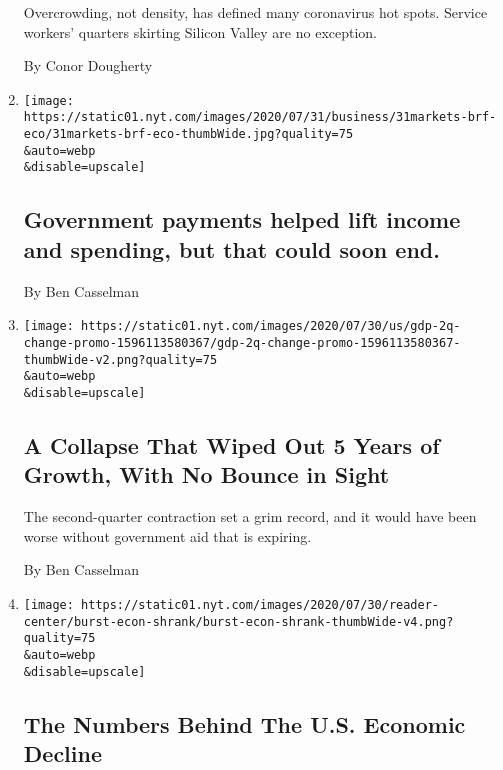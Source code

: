\begin{enumerate}
  Overcrowding, not density, has defined many coronavirus hot spots.
  Service workers' quarters skirting Silicon Valley are no exception.

  By Conor Dougherty
\item
  \href{/live/2020/07/31/business/stock-market-today-coronavirus/government-payments-helped-lift-income-and-spending-but-that-could-soon-end}{}

  \texttt{[image: https://static01.nyt.com/images/2020/07/31/business/31markets-brf-eco/31markets-brf-eco-thumbWide.jpg?quality=75\\\&auto=webp\\\&disable=upscale]}

  \hypertarget{government-payments-helped-lift-income-and-spending-but-that-could-soon-end}{%
  \subsection{Government payments helped lift income and spending, but
  that could soon
  end.}\label{government-payments-helped-lift-income-and-spending-but-that-could-soon-end}}

  By Ben Casselman
\item
  \href{/2020/07/30/business/economy/q2-gdp-coronavirus-economy.html}{}

  \texttt{[image: https://static01.nyt.com/images/2020/07/30/us/gdp-2q-change-promo-1596113580367/gdp-2q-change-promo-1596113580367-thumbWide-v2.png?quality=75\\\&auto=webp\\\&disable=upscale]}

  \hypertarget{a-collapse-that-wiped-out-5-years-of-growth-with-no-bounce-in-sight}{%
  \subsection{A Collapse That Wiped Out 5 Years of Growth, With No
  Bounce in
  Sight}\label{a-collapse-that-wiped-out-5-years-of-growth-with-no-bounce-in-sight}}

  The second-quarter contraction set a grim record, and it would have
  been worse without government aid that is expiring.

  By Ben Casselman
\item
  \href{/interactive/2020/07/30/business/economy-gdp-unemployment.html}{}

  \texttt{[image: https://static01.nyt.com/images/2020/07/30/reader-center/burst-econ-shrank/burst-econ-shrank-thumbWide-v4.png?quality=75\\\&auto=webp\\\&disable=upscale]}

  \hypertarget{the-numbers-behind-the-us-economic-decline}{%
  \subsection{The Numbers Behind The U.S. Economic
  Decline}\label{the-numbers-behind-the-us-economic-decline}}


\end{enumerate}
